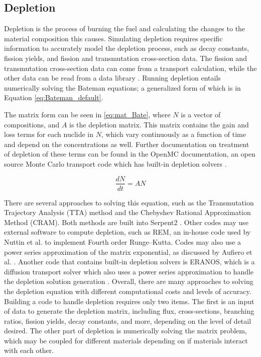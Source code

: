 \subsection{Depletion}

Depletion is the process of burning the fuel and calculating the changes to the material composition this causes. Simulating depletion requires specific information to accurately model the depletion process, such as decay constants, fission yields, and fission and transmutation cross-section data. The fission and transmutation cross-section data can come from a transport calculation, while the other data can be read from a data library \cite{leppanen_development_2007}. Running depletion entails numerically solving the Bateman equations; a generalized form of which is in Equation \ref{eq:Bateman_default}.

The matrix form can be seen in \eqref{eq:mat_Bate}, where $N$ is a vector of compositions, and $A$ is the depletion matrix. This matrix contains the gain and loss terms for each nuclide in $N$, which vary continuously as a function of time and depend on the concentrations as well. Further documentation on treatment of depletion of these terms can be found in the OpenMC documentation, an open source Monte Carlo transport code which has built-in depletion solvers \cite{romano_openmc_2015}.

\begin{equation}
    \frac{dN}{dt} = A N
    \label{eq:mat_Bate}
\end{equation}

There are several approaches to solving this equation, such as the Transmutation Trajectory Analysis (TTA) method and the Chebyshev Rational Approximation Method (CRAM). Both methods are built into Serpent2 %
\cite{leppanen_serpent_2015}.
Other codes may use external software to compute depletion, such as REM, an in-house code used by Nuttin et al. \cite{nuttin_potential_2005} to implement Fourth order Runge–Kutta.
Codes may also use a power series approximation of the matrix exponential, as discussed by Aufiero et al. \cite{aufiero_extended_2013}.
Another code %
that contains built-in depletion solvers is ERANOS, which is a diffusion transport solver which also uses a power series approximation to handle the depletion solution generation \cite{aufiero_extended_2013}. Overall, there are many approaches to solving the depletion equation with different computational costs and levels of accuracy. Building a code to handle depletion requires only two items. The first is an input of data to generate the depletion matrix, including flux, cross-sections, branching ratios, fission yields, decay constants, and more, depending on the level of detail desired. The other part of depletion is numerically solving the matrix problem, which may be coupled for different materials depending on if materials interact with each other.

